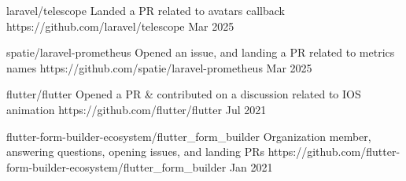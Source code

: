 



\begin{cvprojects}

  \cvproject
    {laravel/telescope} %
    {Landed a PR related to avatars callback} %
    {https://github.com/laravel/telescope} %
    {Mar 2025} %

  \cvproject
    {spatie/laravel-prometheus} %
    {Opened an issue, and landing a PR related to metrics names} %
    {https://github.com/spatie/laravel-prometheus} %
    {Mar 2025} %

  \cvproject
    {flutter/flutter} %
    {Opened a PR \& contributed on a discussion related to IOS animation} %
    {https://github.com/flutter/flutter} %
    {Jul 2021} %

  \cvproject
    {flutter-form-builder-ecosystem/flutter\_form\_builder} %
    {Organization member, answering questions, opening issues, and landing PRs} %
    {https://github.com/flutter-form-builder-ecosystem/flutter_form_builder} %
    {Jan 2021} %

\end{cvprojects}




